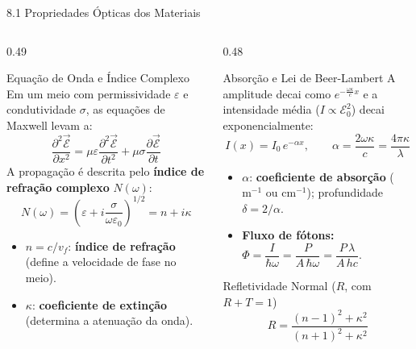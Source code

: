 \documentclass[aspectratio=169, 9pt]{beamer}
\begin{document}
\begin{frame}{8.1 Propriedades Ópticas dos Materiais}
  \begin{columns}[T, onlytextwidth]
    \begin{column}{0.49\textwidth}
      \begin{block}{Equação de Onda e Índice Complexo}
        Em um meio com permissividade $\varepsilon$ e condutividade $\sigma$, as equações de Maxwell levam a:
        \[
          \frac{\partial^2 \vec{\mathcal{E}}}{\partial x^2} = \mu\varepsilon \frac{\partial^2 \vec{\mathcal{E}}}{\partial t^2} + \mu\sigma \frac{\partial \vec{\mathcal{E}}}{\partial t}
        \]
        A propagação é descrita pelo \textbf{índice de refração complexo} $N(\omega)$:
        \[
          N(\omega) = \left(\varepsilon + i\frac{\sigma}{\omega\varepsilon_0}\right)^{1/2} = n + i\kappa
        \]
        \begin{itemize}
          \item $n = c/v_f$: \textbf{índice de refração} (define a velocidade de fase no meio).
          \item $\kappa$: \textbf{coeficiente de extinção} (determina a atenuação da onda).
        \end{itemize}
      \end{block}
    \end{column}

    \begin{column}{0.48\textwidth}
      \begin{alertblock}{Absorção e Lei de Beer-Lambert}
        A amplitude decai como $e^{-\frac{\omega\kappa}{c}x}$ e a intensidade média ($I \propto \mathcal{E}_0^2$) decai exponencialmente:
        \[
          I(x) = I_0 \, e^{-\alpha x}, \qquad \alpha = \frac{2\omega\kappa}{c} = \frac{4\pi\kappa}{\lambda}
        \]
        \begin{itemize}
          \item $\alpha$: \textbf{coeficiente de absorção} ($\text{m}^{-1}$ ou $\text{cm}^{-1}$); profundidade $\delta = 2/\alpha$.
          \item \textbf{Fluxo de fótons:} $\Phi = \dfrac{I}{\hbar\omega} = \dfrac{P}{A\,\hbar\omega} = \dfrac{P\,\lambda}{A\,hc}$.
        \end{itemize}
      \end{alertblock}
      \vspace{-0.1cm}
      \begin{exampleblock}{Refletividade Normal ($R$, com $R + T = 1$)}
        \[
          R = \frac{(n-1)^2 + \kappa^2}{(n+1)^2 + \kappa^2}
        \]
      \end{exampleblock}
    \end{column}
  \end{columns}
\end{frame}
\end{document}
